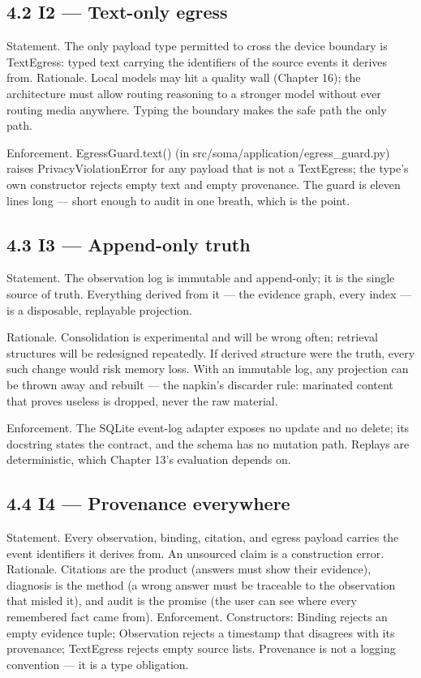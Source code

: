 \subsection{4.2 I2 --- Text-only egress}\label{i2-text-only-egress}

Statement. The only payload type permitted to cross the device boundary is TextEgress: typed text carrying the identifiers of the source events it derives from. Rationale. Local models may hit a quality wall (Chapter 16); the architecture must allow routing reasoning to a stronger model without ever routing media anywhere. Typing the boundary makes the safe path the only path.

Enforcement. EgressGuard.text() (in src/soma/application/egress\_guard.py) raises PrivacyViolationError for any payload that is not a TextEgress; the type's own constructor rejects empty text and empty provenance. The guard is eleven lines long --- short enough to audit in one breath, which is the point.

\subsection{4.3 I3 --- Append-only truth}\label{i3-append-only-truth}

Statement. The observation log is immutable and append-only; it is the single source of truth. Everything derived from it --- the evidence graph, every index --- is a disposable, replayable projection.

Rationale. Consolidation is experimental and will be wrong often; retrieval structures will be redesigned repeatedly. If derived structure were the truth, every such change would risk memory loss. With an immutable log, any projection can be thrown away and rebuilt --- the napkin's discarder rule: marinated content that proves useless is dropped, never the raw material.

Enforcement. The SQLite event-log adapter exposes no update and no delete; its docstring states the contract, and the schema has no mutation path. Replays are deterministic, which Chapter 13's evaluation depends on.

\subsection{4.4 I4 --- Provenance everywhere}\label{i4-provenance-everywhere}

Statement. Every observation, binding, citation, and egress payload carries the event identifiers it derives from. An unsourced claim is a construction error. Rationale. Citations are the product (answers must show their evidence), diagnosis is the method (a wrong answer must be traceable to the observation that misled it), and audit is the promise (the user can see where every remembered fact came from). Enforcement. Constructors: Binding rejects an empty evidence tuple; Observation rejects a timestamp that disagrees with its provenance; TextEgress rejects empty source lists. Provenance is not a logging convention --- it is a type obligation.

